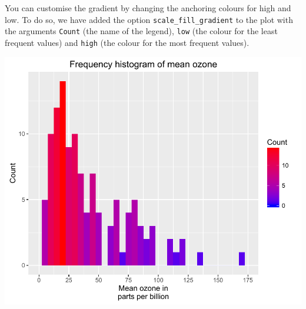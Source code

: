 You can customise the gradient by changing the anchoring colours for
high and low. To do so, we have added the option
\texttt{scale\_fill\_gradient} to the plot with the arguments
\texttt{Count} (the name of the legend), \texttt{low} (the colour for
the least frequent values) and \texttt{high} (the colour for the most
frequent values).

\begin{Shaded}
\begin{Highlighting}[]
\StringTok{ }\NormalTok{(} \StringTok{ }
\StringTok{  }\NormalTok{(}\NormalTok{(}  \NormalTok{) +}
\StringTok{  }\NormalTok{(} \NormalTok{,}
     \NormalTok{(}\NormalTok{, }\NormalTok{, }\NormalTok{), }\NormalTok{(}\NormalTok{, }\NormalTok{)) +}
\StringTok{  }\NormalTok{(} \NormalTok{) +}
\StringTok{  }\NormalTok{(}\NormalTok{) +}
\StringTok{  }\NormalTok{(}\NormalTok{, } \NormalTok{, } \NormalTok{)}
\end{Highlighting}
\end{Shaded}

\begin{center}\includegraphics[width=0.6\linewidth]{7_Histograms_pdf/histogram_12-1} \end{center}


